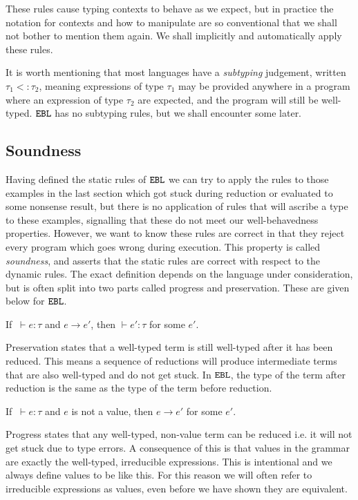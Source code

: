 These rules cause typing contexts to behave as we expect, but in practice the notation for contexts and how to manipulate are so conventional that we shall not bother to mention them again. We shall implicitly and automatically apply these rules.

It is worth mentioning that most languages have a \textit{subtyping} judgement, written $\tau_1 <: \tau_2$, meaning expressions of type $\tau_1$ may be provided anywhere in a program where an expression of type $\tau_2$ are expected, and the program will still be well-typed. $\mathtt{EBL}$ has no subtyping rules, but we shall encounter some later.

\subsection{Soundness}

Having defined the static rules of $\mathtt{EBL}$ we can try to apply the rules to those examples in the last section which got stuck during reduction or evaluated to some nonsense result, but there is no application of rules that will ascribe a type to these examples, signalling that these do not meet our well-behavedness properties. However, we want to know these rules are correct in that they reject every program which goes wrong during execution. This property is called \textit{soundness}, and asserts that the static rules are correct with respect to the dynamic rules. The exact definition depends on the language under consideration, but is often split into two parts called progress and preservation. These are given below for $\mathtt{EBL}$.

\begin{theorem}
If $~\vdash e: \tau$ and $e \longrightarrow e'$, then $\vdash e': \tau$ for some $e'$.
\end{theorem}

Preservation states that a well-typed term is still well-typed after it has been reduced. This means a sequence of reductions will produce intermediate terms that are also well-typed and do not get stuck. In $\mathtt{EBL}$, the type of the term after reduction is the same as the type of the term before reduction.

\begin{theorem}
If $~\vdash e: \tau$ and $e$ is not a value, then $e \longrightarrow e'$ for some $e'$.
\end{theorem}

Progress states that any well-typed, non-value term can be reduced i.e. it will not get stuck due to type errors. A consequence of this is that values in the grammar are exactly the well-typed, irreducible expressions. This is intentional and we always define values to be like this. For this reason we will often refer to irreducible expressions as values, even before we have shown they are equivalent.

